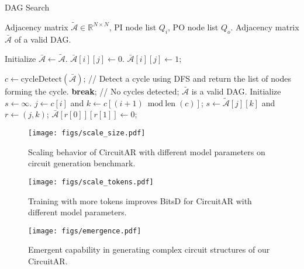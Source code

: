 \begin{algorithm}[tb]
\renewcommand{\algorithmicrequire}{\textbf{Input:}}
\renewcommand{\algorithmicensure}{\textbf{Output:}}
\caption{DAG Search}
\label{algo:dag_search}
\begin{algorithmic}[1]
\REQUIRE Adjacency matrix $\tilde{\mathcal{A}} \in \mathbb{R}^{N \times N}$, PI node list $Q_i$, PO node list $Q_o$.
\ENSURE Adjacency matrix $\bar{\mathcal{A}}$ of a valid DAG.

\STATE Initialize $\bar{\mathcal{A}} \gets \tilde{\mathcal{A}}$.
	\STATE $\bar{\mathcal{A}}[i][j] \gets 0$.
        \STATE $\bar{\mathcal{A}}[i][j] \gets 1$;
    \ENDIF
\ENDFOR

    \STATE $c \gets \text{cycleDetect}(\bar{\mathcal{A}})$; // Detect a cycle using DFS and return the list of nodes forming the cycle.
        \STATE \textbf{break}; // No cycles detected; $\bar{\mathcal{A}}$ is a valid DAG.
    \ENDIF
    \STATE Initialize $s \gets \infty$.
        \STATE $j \gets c[i]$ and $k \gets c[(i + 1) \bmod \text{len}(c)]$;
            \STATE $s \gets \tilde{\mathcal{A}}[j][k]$ and $r \gets (j, k)$;
        \ENDIF
    \ENDFOR
    \STATE $\bar{\mathcal{A}}[r[0]][r[1]] \gets 0$;
\ENDWHILE
\end{algorithmic}
\end{algorithm}


\begin{figure*}[]
\centering
\begin{minipage}[t]{0.31\linewidth}
\centering
\texttt{[image: figs/scale\_size.pdf]}
\caption{Scaling behavior of CircuitAR with different model parameters on circuit generation benchmark.}
\label{fig:scale_size}
\end{minipage}
\hspace{6pt}
\begin{minipage}[t]{0.31\linewidth}
\centering
\texttt{[image: figs/scale\_tokens.pdf]}
\caption{Training with more tokens improves BitsD for CircuitAR with different model parameters.}
\label{fig:scale_tokens}
\end{minipage}
\hspace{6pt}
\begin{minipage}[t]{0.31\linewidth}
\centering
\texttt{[image: figs/emergence.pdf]}
\caption{Emergent capability in generating complex circuit structures of our CircuitAR.}
\label{fig:emergent}
\end{minipage}
\end{figure*}

